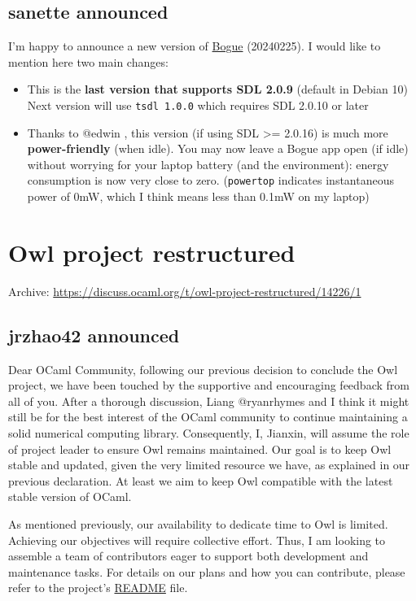 \documentclass[11pt]{article}
\begin{document}
\subsection*{sanette announced}
\label{sec:orgc23b8a4}


I'm happy to announce a new version of \href{https://github.com/sanette/bogue}{Bogue} (20240225). I would like to
mention here two main changes:
\begin{itemize}
\item This is the \textbf{last version that supports SDL 2.0.9} (default in Debian 10) Next version will use \texttt{tsdl 1.0.0} which requires SDL 2.0.10 or later
\item Thanks to @edwin , this version (if using SDL >= 2.0.16) is much more  \textbf{\textbf{power-friendly}} (when idle). You may now leave a Bogue app open (if idle) without worrying for your laptop battery (and the environment): energy consumption is now very close to zero. (\texttt{powertop} indicates instantaneous power of 0mW, which I think means less than 0.1mW on my laptop)
\end{itemize}
\section*{Owl project restructured}
\label{9}
Archive: \url{https://discuss.ocaml.org/t/owl-project-restructured/14226/1}
\subsection*{jrzhao42 announced}
\label{sec:org19fd6d3}


Dear OCaml Community, following our previous decision to conclude the Owl project, we have been touched by the
supportive and encouraging feedback from all of you. After a thorough discussion, Liang @ryanrhymes and I think it
might still be for the best interest of the OCaml community to continue maintaining a solid numerical computing
library. Consequently, I, Jianxin, will assume the role of project leader to ensure Owl remains maintained. Our
goal is to keep Owl stable and updated, given the very limited resource we have, as explained in our previous
declaration.  At least we aim to keep Owl compatible with the latest stable version of OCaml.

As mentioned previously, our availability to dedicate time to Owl is limited. Achieving our objectives will require
collective effort. Thus, I am looking to assemble a team of contributors eager to support both development and
maintenance tasks. For details on our plans and how you can contribute, please refer to the project's
\href{https://github.com/owlbarn/owl}{README} file.
\end{document}

